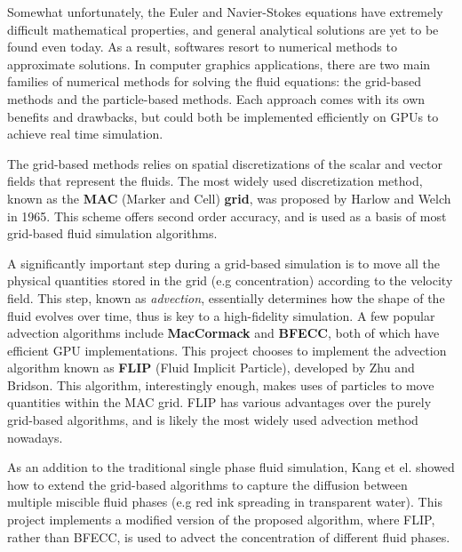 Somewhat unfortunately, the Euler and Navier-Stokes equations have extremely difficult mathematical properties, and general analytical solutions are yet to be found even today. As a result, softwares resort to numerical methods to approximate solutions. In computer graphics applications, there are two main families of numerical methods for solving the fluid equations: the grid-based methods and the particle-based methods. Each approach comes with its own benefits and drawbacks, but could both be implemented efficiently on GPUs to achieve real time simulation.

The grid-based methods relies on spatial discretizations of the scalar and vector fields that represent the fluids. The most widely used discretization method, known as the \textbf{MAC} (Marker and Cell) \textbf{grid}, was proposed by Harlow and Welch \cite{harlow1965numerical} in 1965. This scheme offers second order accuracy, and is used as a basis of most grid-based fluid simulation algorithms. 

A significantly important step during a grid-based simulation is to move all the physical quantities stored in the grid (e.g concentration) according to the velocity field. This step, known as \textit{advection}, essentially determines how the shape of the fluid evolves over time, thus is key to a high-fidelity simulation. A few popular advection algorithms include \textbf{MacCormack}\cite{selle2008unconditionally} and \textbf{BFECC}\cite{kim2005flowfixer}, both of which have efficient GPU implementations\cite{chentanez2011real}\cite{xu2011interactive}. This project chooses to implement the advection algorithm known as \textbf{FLIP} (Fluid Implicit Particle)\cite{zhu2005animating}, developed by Zhu and Bridson. This algorithm, interestingly enough, makes uses of particles to move quantities within the MAC grid. FLIP has various advantages over the purely grid-based algorithms, and is likely the most widely used advection method nowadays. 

As an addition to the traditional single phase fluid simulation, Kang et el.\cite{kang2010hybrid} showed how to extend the grid-based algorithms to capture the diffusion between multiple miscible fluid phases (e.g red ink spreading in transparent water). This project implements a modified version of the proposed algorithm, where FLIP, rather than BFECC, is used to advect the concentration of different fluid phases.



